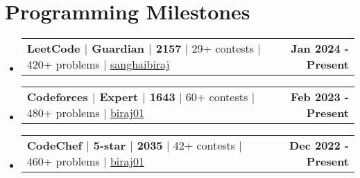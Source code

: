 \documentclass[letterpaper,11pt]{article}
\makeatletter
\newcommand{\resumeProjectHeading}[2]{
    \item
    \begin{tabular*}{1.001\textwidth}{l@{\extracolsep{\fill}}r}
      \small#1 & \textbf{\small #2}\\
    \end{tabular*}\vspace{-7pt}
}
\newcommand{\resumeSubHeadingListStart}{\begin{itemize}[leftmargin=0.0in, label={}]}
\newcommand{\resumeSubHeadingListEnd}{\end{itemize}}
\makeatother
\begin{document}
\section{Programming Milestones}
\vspace{-8pt}
    \resumeSubHeadingListStart
        \resumeProjectHeading
            {\textbf{LeetCode $|$ Guardian $|$ 2157} $|$ 29+ contests $|$ 420+ problems $|$ \color{Blue}\href{https://leetcode.com/sanghaibiraj/}{sanghaibiraj}}
            {Jan 2024 - Present}
        \vspace{-24pt}
        \resumeProjectHeading  
            {\textbf{Codeforces $|$ Expert $|$ 1643} $|$ 60+ contests $|$ 480+ problems $|$ \color{Blue}\href{https://codeforces.com/profile/biraj01}{biraj01}}
            {Feb 2023 - Present}
        \vspace{-24pt}
        \resumeProjectHeading  
            {\textbf{CodeChef $|$ 5-star $|$ 2035} $|$ 42+ contests $|$ 460+ problems $|$ \color{Blue}\href{https://www.codechef.com/users/biraj01}{biraj01}}
            {Dec 2022 - Present}
    \resumeSubHeadingListEnd
    \vspace{-4mm}
    
\end{document}
